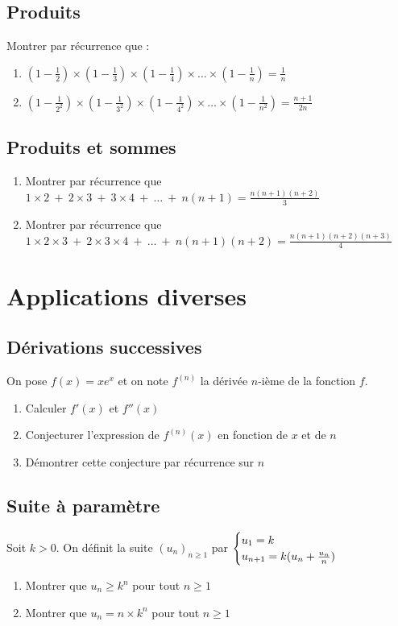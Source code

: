 \documentclass[oneside,12pt]{book}          %
\begin{document}
\subsection{Produits}

Montrer par récurrence que :
\begin{enumerate}
    \item $(1-\frac{1}{2})\times(1-\frac{1}{3})\times(1-\frac{1}{4})\times\ldots\times(1-\frac{1}{n})=\frac{1}{n}$
    \item $(1-\frac{1}{2^2})\times(1-\frac{1}{3^2})\times(1-\frac{1}{4^2})\times\ldots\times(1-\frac{1}{n^2})=\frac{n+1}{2n}$
\end{enumerate}



\subsection{Produits et sommes}
\begin{enumerate}
    \item Montrer par récurrence que $1\times2~+~2\times3~+~3\times4~+~\ldots~+~n(n+1)=\frac{n(n+1)(n+2)}{3}$
    \item Montrer par récurrence que $1\times2\times3~+~2\times3\times4~+~\ldots~+~n(n+1)(n+2)=\frac{n(n+1)(n+2)(n+3)}{4}$
\end{enumerate}



\section{Applications diverses}

\subsection{Dérivations successives}
On pose $f(x)=xe^x$ et on note $f^{(n)}$ la dérivée $n$-ième de la fonction $f$.
\begin{enumerate}
	\item Calculer $f'(x)$ et $f''(x)$
	\item Conjecturer l'expression de $f^{(n)}(x)$ en fonction de $x$ et de $n$
	\item Démontrer cette conjecture par récurrence sur $n$
\end{enumerate}



\subsection{Suite à paramètre}
Soit $k>0$. On définit la suite $(u_n)_{n\geq1}$ par $\defsuite{u_1=k}{k(u_n+\frac{u_n}{n})}$
    \begin{enumerate}
        \item Montrer que $u_n\geq k^n$ pour tout $n\geq1$
        \item Montrer que $u_n=n\times k^n$ pour tout $n\geq1$
    \end{enumerate}
\end{document}
